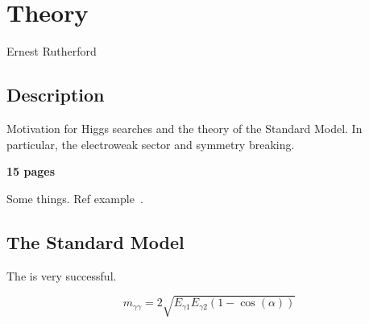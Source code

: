 \chapter{Theory}
\label{chap:theory}
{Ernest Rutherford}

\section{Description}

Motivation for Higgs searches and the theory of the Standard Model. In particular, the electroweak sector and symmetry breaking.

\textbf{15 pages}

Some things. Ref example~\cite{Phys.Rev.Lett.19.1264, Phys.Rev.D2.1285,hep-ph/0410370}.

\section{The Standard Model}
\label{sec:standardmodel}

The \SM is very successful.


\begin{equation}
	m_{\gamma\gamma} = 2\sqrt{E_{\gamma1}E_{\gamma2}(1-\cos(\alpha))}
\label{eq:invmass}
\end{equation}
